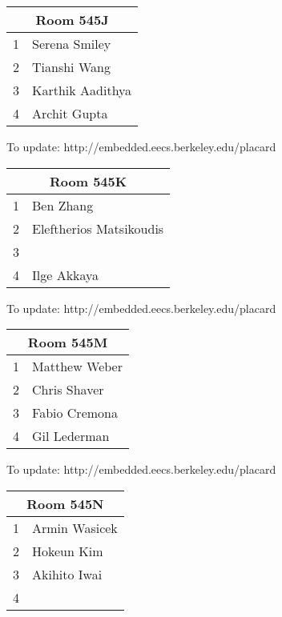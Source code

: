 \documentclass{article}
\begin{document}
\noindent
\begin{tabular}{|l|l|}
\hline
\multicolumn{2}{|c|}{Room 545J} \\ \hline\hline
1&Serena Smiley\\
2&Tianshi Wang\\
3&Karthik Aadithya\\
4&Archit Gupta\\

\hline
\end{tabular}

{\scriptsize To update: http://embedded.eecs.berkeley.edu/placard}
\vspace{1in}

\noindent
\begin{tabular}{|l|l|}
\hline
\multicolumn{2}{|c|}{Room 545K} \\ \hline\hline
1&Ben Zhang\\
2&Eleftherios Matsikoudis\\
3& \\
4&Ilge Akkaya\\

\hline
\end{tabular}

{\scriptsize To update: http://embedded.eecs.berkeley.edu/placard}
\vspace{1in}

\noindent
\begin{tabular}{|l|l|}
\hline
\multicolumn{2}{|c|}{Room 545M} \\ \hline\hline
1&Matthew Weber\\
2&Chris Shaver\\
3&Fabio Cremona\\
4&Gil Lederman\\

\hline
\end{tabular}

{\scriptsize To update: http://embedded.eecs.berkeley.edu/placard}
\vspace{1in}

\noindent
\begin{tabular}{|l|l|}
\hline
\multicolumn{2}{|c|}{Room 545N} \\ \hline\hline
1&Armin Wasicek\\
2&Hokeun Kim\\
3&Akihito Iwai\\
4& \\

\hline
\end{tabular}
\end{document}
